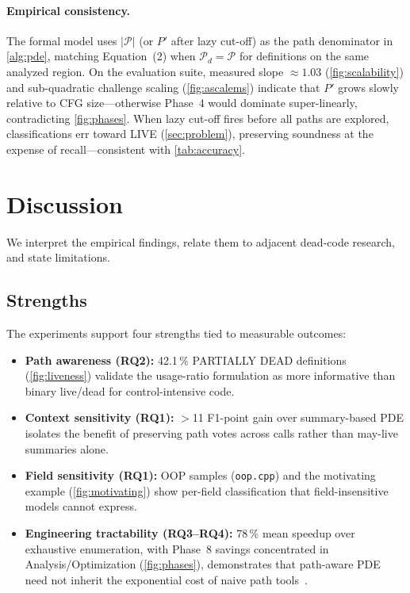 \documentclass[acmsmall,screen,review,anonymous]{acmart}
\begin{document}
\paragraph{Empirical consistency.}
The formal model uses $|\mathcal{P}|$ (or $P'$ after lazy cut-off) as the path denominator in \autoref{alg:pde}, matching Equation~(2) when $\mathcal{P}_d=\mathcal{P}$ for definitions on the same analyzed region. On the evaluation suite, measured slope $\approx 1.03$ (\autoref{fig:scalability}) and sub-quadratic challenge scaling (\autoref{fig:ascalems}) indicate that $P'$ grows slowly relative to CFG size---otherwise Phase~4 would dominate super-linearly, contradicting \autoref{fig:phases}. When lazy cut-off fires before all paths are explored, classifications err toward LIVE (\autoref{sec:problem}), preserving soundness at the expense of recall---consistent with \autoref{tab:accuracy}.

\section{Discussion}
\label{sec:discussion}
We interpret the empirical findings, relate them to adjacent dead-code research, and state limitations.

\subsection{Strengths}
The experiments support four strengths tied to measurable outcomes:
\begin{itemize}[leftmargin=*,itemsep=1pt]
\item \textbf{Path awareness (RQ2):} 42.1\,\% PARTIALLY DEAD definitions (\autoref{fig:liveness}) validate the usage-ratio formulation as more informative than binary live/dead for control-intensive code.
\item \textbf{Context sensitivity (RQ1):} $>$11 F1-point gain over summary-based PDE isolates the benefit of preserving path votes across calls rather than may-live summaries alone.
\item \textbf{Field sensitivity (RQ1):} OOP samples (\texttt{oop.cpp}) and the motivating example (\autoref{fig:motivating}) show per-field classification that field-insensitive models cannot express.
\item \textbf{Engineering tractability (RQ3--RQ4):} 78\,\% mean speedup over exhaustive enumeration, with Phase~8 savings concentrated in Analysis/Optimization (\autoref{fig:phases}), demonstrates that path-aware PDE need not inherit the exponential cost of naive path tools~\cite{ball2001slam,henzinger2002blast}.
\end{itemize}
\end{document}
